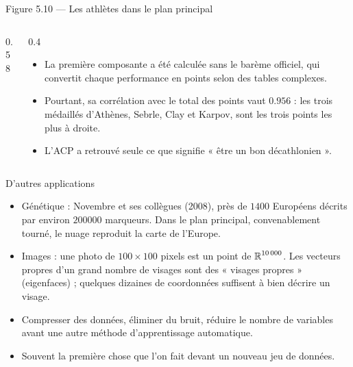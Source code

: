 \begin{frame}{Figure 5.10 --- Les athlètes dans le plan principal}
  \begin{columns}[c]
    \begin{column}{0.58\textwidth}
    \end{column}
    \begin{column}{0.4\textwidth}
      \small
      \begin{itemize}
        \item La première composante a été calculée sans le barème officiel,
          qui convertit chaque performance en points selon des tables
          complexes.
        \item Pourtant, sa corrélation avec le total des points vaut
          $\num{0.956}$ : les trois médaillés d'Athènes, Sebrle, Clay et
          Karpov, sont les trois points les plus à droite.
        \item L'ACP a retrouvé seule ce que signifie « être un bon
          décathlonien ».
      \end{itemize}
    \end{column}
  \end{columns}
\end{frame}

\begin{frame}{D'autres applications}
  \begin{itemize}
    \item Génétique : Novembre et ses collègues (2008), près de
      $\num{1400}$ Européens décrits par environ $\num{200000}$ marqueurs.
      Dans le plan principal, convenablement tourné, le nuage reproduit la
      carte de l'Europe.
    \item Images : une photo de $100\times100$ pixels est un point de
      $\operatorname{\mathbb{R}}^{\num{10000}}$. Les vecteurs propres d'un grand nombre de visages
      sont des « visages propres » (eigenfaces) ; quelques dizaines de
      coordonnées suffisent à bien décrire un visage.
    \item Compresser des données, éliminer du bruit, réduire le nombre de
      variables avant une autre méthode d'apprentissage automatique.
    \item Souvent la première chose que l'on fait devant un nouveau jeu de
      données.
  \end{itemize}
\end{frame}

